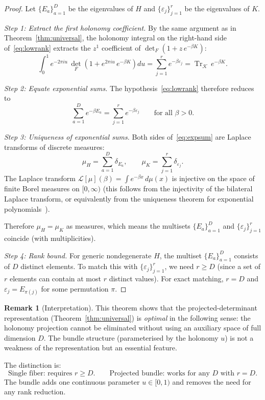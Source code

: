 \documentclass[12pt]{article}
\theoremstyle{plain}
\theoremstyle{definition}
\newtheorem{remark}[theorem]{Remark}
\numberwithin{equation}{section}
\DeclareMathOperator{\Tr}{Tr}
\begin{document}
\begin{proof}
Let $\{E_a\}_{a=1}^D$ be the eigenvalues of $H$ and
$\{\varepsilon_j\}_{j=1}^r$ be the eigenvalues of $K$.

\emph{Step 1: Extract the first holonomy coefficient.}
By the same argument as in Theorem~\ref{thm:universal}, the
holonomy integral on the right-hand side of~\eqref{eq:lowrank}
extracts the $z^1$ coefficient of $\det_F(1+z\,e^{-\beta K})$:
\begin{equation}
\int_0^1 e^{-2\pi iu}\,\det_F\!\left(1+e^{2\pi iu}\,e^{-\beta K}\right)du
= \sum_{j=1}^r e^{-\beta\varepsilon_j}
= \Tr_{\mathcal{K}}\,e^{-\beta K}.
\end{equation}

\emph{Step 2: Equate exponential sums.}
The hypothesis~\eqref{eq:lowrank} therefore reduces to
\begin{equation}\label{eq:expsum}
\sum_{a=1}^D e^{-\beta E_a} = \sum_{j=1}^r e^{-\beta\varepsilon_j}
\qquad\text{for all }\beta>0.
\end{equation}

\emph{Step 3: Uniqueness of exponential sums.}
Both sides of~\eqref{eq:expsum} are Laplace transforms of discrete
measures:
\begin{equation}
\mu_H = \sum_{a=1}^D \delta_{E_a},\qquad
\mu_K = \sum_{j=1}^r \delta_{\varepsilon_j}.
\end{equation}
The Laplace transform $\mathcal{L}[\mu](\beta)=\int e^{-\beta x}\,d\mu(x)$
is injective on the space of finite Borel measures on $[0,\infty)$
(this follows from the injectivity of the bilateral Laplace transform,
or equivalently from the uniqueness theorem for exponential
polynomials~\cite{Simon}).

Therefore $\mu_H=\mu_K$ as measures, which means the multisets
$\{E_a\}_{a=1}^D$ and $\{\varepsilon_j\}_{j=1}^r$ coincide
(with multiplicities).

\emph{Step 4: Rank bound.}
For generic nondegenerate $H$, the multiset $\{E_a\}_{a=1}^D$ consists
of $D$ distinct elements.  To match this with $\{\varepsilon_j\}_{j=1}^r$,
we need $r\geq D$ (since a set of $r$ elements can contain at most $r$
distinct values).  For exact matching, $r=D$ and $\varepsilon_j=E_{\pi(j)}$
for some permutation $\pi$.
\end{proof}

\begin{remark}[Interpretation]
This theorem shows that the projected-determinant representation
(Theorem~\ref{thm:universal}) is \emph{optimal} in the following sense:
the holonomy projection cannot be eliminated without using an auxiliary
space of full dimension $D$.  The bundle structure (parameterised by the
holonomy $u$) is not a weakness of the representation but an essential
feature.

The distinction is:
\begin{equation}
\boxed{\text{Single fiber: requires }r\geq D.\qquad
\text{Projected bundle: works for any }D\text{ with }r=D.}
\end{equation}
The bundle adds one continuous parameter $u\in[0,1)$ and removes the
need for any rank reduction.
\end{remark}
\end{document}
